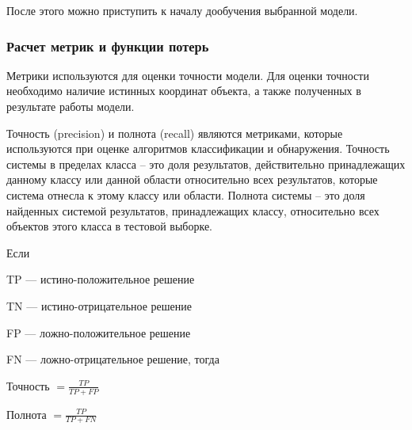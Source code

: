 После этого можно приступить к началу дообучения выбранной модели.

\subsubsection{Расчет метрик и функции потерь}

Метрики используются для оценки точности модели. Для оценки точности необходимо наличие истинных координат объекта, а также полученных в результате работы модели. 

Точность (precision) и полнота (recall) являются метриками, которые используются при оценке алгоритмов классификации и обнаружения. Точность системы в пределах класса – это доля результатов, действительно принадлежащих данному классу или данной области относительно всех результатов, которые система отнесла к этому классу или области. Полнота системы – это доля найденных системой результатов, принадлежащих классу, относительно всех объектов этого класса в тестовой выборке.

Если 

%
\begin{itemize*}
  \item TP — истино-положительное решение
  \item TN — истино-отрицательное решение
  \item FP — ложно-положительное решение
  \item FN — ложно-отрицательное решение, тогда
\end{itemize*}
%
\begin{center}
Точность \(= \frac{TP}{TP+FP}\)
\end{center}

\begin{center}
Полнота \( = \frac{TP}{TP+FN}\)
\end{center}

